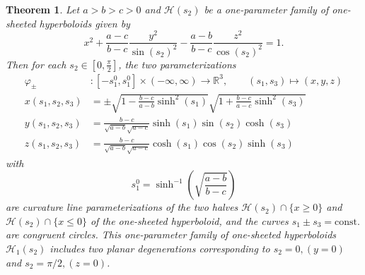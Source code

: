 \documentclass[10pt, a4paper]{article}
\theoremstyle{BoldTopSpacing}
\newtheorem{theorem}{Theorem}[section]
\theoremstyle{BoldTopSpacing}
\theoremstyle{BoldTopSpacing}
\theoremstyle{BoldTopBottomSpacing}
\theoremstyle{BoldTopSpacing}
\theoremstyle{BoldTopBottomSpacing}
\theoremstyle{remark}
\begin{document}
\begin{theorem}
\label{thm:isometric-deformation-para-one-hyperboloid}
Let $a > b > c > 0$ and $\mathcal{H}(s_{2})$ be a one-parameter family of one-sheeted hyperboloids given by
\begin{equation*}
x^2 + \frac{a - c}{b - c} \frac{y^2}{\sin(s_{2})^2} -  \frac{a - b}{b - c} \frac{z^2}{ \cos(s_{2})^2} = 1.
\end{equation*}
Then for each $s_{2} \in \left[ 0, \frac{\pi}{2} \right]$, the two parameterizations
\begin{align*}
    \varphi_{\pm} &: [-s_{1}^{0}, s_{1}^{0}] \times (-\infty, \infty) \to \mathbb{R}^3, \quad \quad (s_{1}, s_{3}) \mapsto (x, y, z) \\[10pt]
    x(s_{1}, s_{2}, s_{3}) &= \pm \sqrt{1 - \frac{b - c}{a - b} \sinh^2(s_{1})} \sqrt{1 + \frac{b - c}{a - c}\sinh^2(s_{3})} \\[10pt]
    y(s_{1}, s_{2}, s_{3}) &= \frac{b - c}{\sqrt{a - b} \sqrt{a - c}} \sinh(s_{1}) \sin(s_{2})\cosh(s_{3}) \\[10pt]
    z(s_{1}, s_{2}, s_{3}) &= \frac{b - c}{\sqrt{a - b} \sqrt{a - c}}  \cosh(s_{1}) \cos(s_{2}) \sinh(s_{3})
\end{align*}
with
\[
    s_{1}^{0} = \sinh^{-1}\left( \sqrt{ \frac{a - b}{b - c} } \right)
\]
\sloppy are curvature line parameterizations of the two halves ${\mathcal{H}(s_{2}) \cap \{ x \geq 0\}}$ and ${\mathcal{H}(s_{2}) \cap \{ x \leq 0\}}$ of the one-sheeted hyperboloid, and the curves $s_{1} \pm s_{3} = \text{const.}$ are congruent circles. \newline
This one-parameter family of one-sheeted hyperboloids $\mathcal{H}_{1}(s_{2})$ includes two planar degenerations corresponding to $s_{2} = 0,\left(y = 0 \right)$ and $s_{2} = \pi/2, \left( z = 0 \right)$.
\end{theorem}
\end{document}
